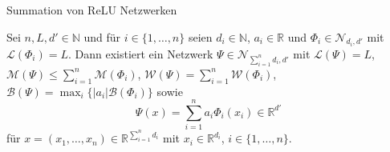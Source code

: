 \documentclass[10pt,aspectratio=169]{beamer}
\newcommand{\N}{\mathbb{N}} %
\newcommand{\R}{\mathbb{R}} %
\newcommand{\set}[1]{\{#1\}}
\begin{document}
\begin{frame}{Summation von ReLU Netzwerken}
    \begin{lemma}
        Sei \(n, L, d' \in\N\) und für \(i\in \set{1,\ldots, n}\) seien \(d_i \in \N\), \(a_i \in \R\) und \(\Phi_i \in \mathcal{N}_{d_i, d'}\) 
        mit \(\mathcal{L}(\Phi_i) = L\). Dann existiert ein Netzwerk \(\Psi \in \mathcal{N}_{\sum_{i=1}^n d_i, d'}\) 
        mit \(\mathcal{L}(\Psi) = L\), \(\mathcal{M}(\Psi) \leq \sum_{i=1}^n \mathcal{M}(\Phi_i)\), 
        \(\mathcal{W}(\Psi) = \sum_{i=1}^n \mathcal{W}(\Phi_i)\), \(\mathcal{B}(\Psi) = \max_i \set{|a_i| \mathcal{B}(\Phi_i)}\) sowie 
        \[ \Psi(x) = \sum_{i=1}^n a_i \Phi_i(x_i) \in \R^{d'} \]
        für \(x = (x_1, \ldots, x_n) \in \R^{\sum_{i=1}^n d_i}\) mit \(x_i \in \R^{d_i}\), \(i\in \set{1,\ldots, n}\).
    \end{lemma}
\end{frame}
\end{document}

